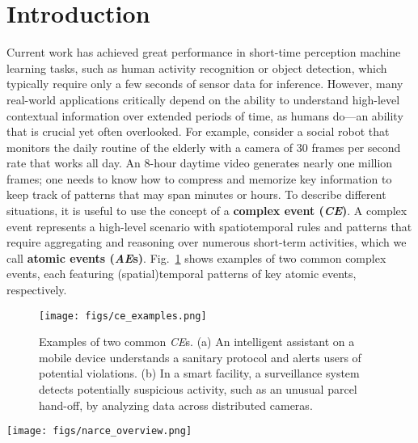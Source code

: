 \section{Introduction}
Current work has achieved great performance in short-time perception machine learning tasks, such as human activity recognition or object detection, which typically require only a few seconds of sensor data for inference. However, many real-world applications critically depend on the ability to understand high-level contextual information over extended periods of time, as humans do—an ability that is crucial yet often overlooked. For example, consider a social robot that monitors the daily routine of the elderly with a camera of 30 frames per second rate that works all day. An 8-hour daytime video generates nearly one million frames; one needs to know how to compress and memorize key information to keep track of patterns that may span minutes or hours. To describe different situations, it is useful to use the concept of a \textbf{complex event (\emph{CE})}. A complex event represents a high-level scenario with spatiotemporal rules and patterns that require aggregating and reasoning over numerous short-term activities, which we call \textbf{atomic events (\emph{AE}s)}. Fig.~\ref{fig:ce_examples} shows examples of two common complex events, each featuring (spatial)temporal patterns of key atomic events, respectively. 

\begin{figure}[t]
    \centering
\texttt{[image: figs/ce\_examples.png]}
\caption{Examples of two common \emph{CE}s. (a) An intelligent assistant on a mobile device understands a sanitary protocol and alerts users of potential violations. (b) In a smart facility, a surveillance system detects potentially suspicious activity, such as an unusual parcel hand-off, by analyzing data across distributed cameras. }
    \label{fig:ce_examples}
    \vspace{-1em}
\end{figure}


\begin{figure*}[t]
    \centering
        \setlength{\abovecaptionskip}{0.cm}
    \setlength{\belowcaptionskip}{0.cm}
\texttt{[image: figs/narce\_overview.png]}
\caption{Overview of the \narce{} Framework.  
    In \textbf{Stage 1}, an \textbf{LLM Synthesizer} generates pseudo concept \emph{AE} traces based on predefined complex event rules. These traces are tokenized and paired with online \emph{CE} labels to train the \textbf{Mamba-Based \emph{CE} NAR}.  
    In \textbf{Stage 2}, the trained \textbf{\emph{CE} NAR} is frozen, and a \textbf{Sensor Adapter $f'$} is trained to map sensor embeddings into its latent space, enabling online CE detection from raw sensor streams.}
    \label{fig:narce_overview}
    \vspace{-0.5em}
\end{figure*}

